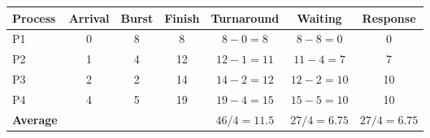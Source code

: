 \begin{tabular}{@{}lcccccc@{}}
\toprule
\textbf{Process} & \textbf{Arrival} & \textbf{Burst} & \textbf{Finish} & \textbf{Turnaround} & \textbf{Waiting} & \textbf{Response}\\
\midrule
P1 & 0 & 8 & 8 & $8-0=8$ & $8-8=0$ & 0\\
P2 & 1 & 4 & 12 & $12-1=11$ & $11-4=7$ & 7\\
P3 & 2 & 2 & 14 & $14-2=12$ & $12-2=10$ & 10\\
P4 & 4 & 5 & 19 & $19-4=15$ & $15-5=10$ & 10\\
\midrule
\textbf{Average} &  &  &  & $46/4=11.5$ & $27/4=6.75$ & $27/4=6.75$\\
\bottomrule
\end{tabular}
